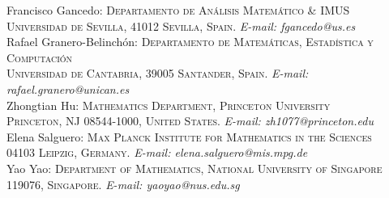 \documentclass[11pt]{article}
\numberwithin{equation}{section}
\begin{document}
\begin{flushleft}
	Francisco Gancedo: 
	\textsc{Departamento de An\'alisis Matem\'atico \& IMUS\\ Universidad de Sevilla,
	41012 Sevilla, Spain.}
	\textit{E-mail:
    fgancedo@us.es}\\
    \medskip
    Rafael Granero-Belinchón: 
	\textsc{Departamento de Matemáticas, Estadística y Computación\\ Universidad de Cantabria,
	39005 Santander, Spain.}
	\textit{E-mail:
    rafael.granero@unican.es}\\
    \medskip
    Zhongtian Hu: 
	\textsc{Mathematics Department,
    Princeton University\\
	Princeton, NJ 08544-1000, United States.}
	\textit{E-mail:
    zh1077@princeton.edu} \\
     \medskip
   Elena Salguero: 
	\textsc{Max Planck Institute for Mathematics in the Sciences\\
	04103 Leipzig, Germany.}
	\textit{E-mail:
    elena.salguero@mis.mpg.de} \\
    \medskip
    Yao Yao: 
	\textsc{Department of Mathematics, National University of Singapore\\
	119076, Singapore.}
	\textit{E-mail:
    yaoyao@nus.edu.sg}
\end{flushleft}
\end{document}
